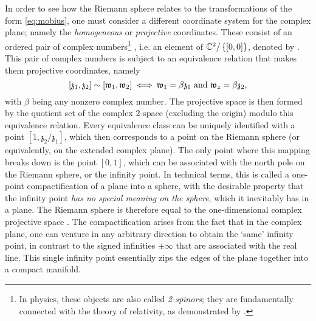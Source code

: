 In order to see how the Riemann sphere relates to the transformations of the form \cref{eq:mobius}, one must consider a different coordinate system for the complex plane; namely the \emph{homogeneous} or \emph{projective} coordinates. These consist of an ordered pair of complex numbers\footnote{In physics, these objects are also called \emph{2-spinors}; they are fundamentally connected with the theory of relativity, as demonstrated by \cite{Penrose1984}.} , i.e. an element of \(\mathbb{C}^2/\left\{[0, 0]\right\}\),  denoted by . This pair of complex numbers is subject to an equivalence relation that makes them projective coordinates, namely 
\[
    \qty[\mathfrak{z}_1, \mathfrak{z}_2] \sim \qty[\mathfrak{w}_1, \mathfrak{w}_2] \iff \mathfrak{w}_1 = \beta \mathfrak{z}_1 \text{ and } \mathfrak{w_2} = \beta \mathfrak{z}_2,
\]
with \(\beta\) being any nonzero complex number. The projective space is then formed by the quotient set of the complex 2-space (excluding the origin) modulo this equivalence relation. Every equivalence class can be uniquely identified with a point \([1, \mathfrak{z}_2/\mathfrak{z}_1]\), which then corresponds to a point on the Riemann sphere (or equivalently, on the extended complex plane). The only point where this mapping breaks down is the point \([0, 1]\), which can be associated with the north pole on the Riemann sphere, or the infinity point. In technical terms, this is called a one-point compactification of a plane into a sphere, with the desirable property that the infinity point \emph{has no special meaning on the sphere}, which it inevitably has in a plane. The Riemann sphere is therefore equal to the one-dimensional complex projective space  \cite{Thurston1997}. The compactification arises from the fact that in the complex plane, one can venture in any arbitrary direction to obtain the `same' infinity point, in contrast to the signed infinities $\pm \infty$ that are associated with the real line. This single infinity point essentially zips the edges of the plane together into a compact manifold.

